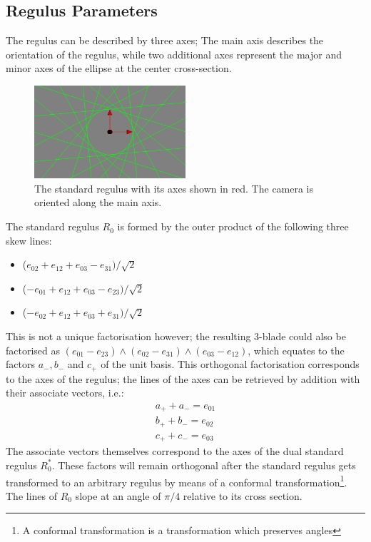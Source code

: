 \documentclass[a4paper, 10pt]{article}
\begin{document}
\subsection{Regulus Parameters}
The regulus can be described by three axes; The main axis describes the
orientation of the regulus, while two additional axes represent the major and
minor axes of the ellipse at the center cross-section.

\begin{figure}[htbp]
  \centering
  \includegraphics[width=0.5\textwidth]{axes.png}
  \caption{The standard regulus with its axes shown in red. The camera is
    oriented along the main axis.}
  \label{fig:axes}
\end{figure}

The standard regulus $R_0$ is formed by the outer product of the following three
skew lines:
\begin{itemize}
  \item ($e_{02} + e_{12} + e_{03} - e_{31}) / \sqrt{2}$
  \item ($-e_{01} + e_{12} + e_{03} - e_{23}) / \sqrt{2}$
  \item ($-e_{02} + e_{12} + e_{03} + e_{31}) / \sqrt{2}$
\end{itemize}

This is not a unique factorisation however; the resulting 3-blade could also be
factorised as $(e_{01} - e_{23}) \wedge (e_{02} - e_{31}) \wedge (e_{03} - e_{12})$, which
equates to the factors $a_-, b_-$ and $c_+$ of the unit basis. This
orthogonal factorisation corresponds to the axes of the regulus; the lines of
the axes can be retrieved by addition with their associate vectors, i.e.:
\begin{align*}
  a_+ + a_- = e_{01} \\
  b_+ + b_- = e_{02} \\
  c_+ + c_- = e_{03}
\end{align*}
The associate vectors themselves correspond to the axes of the dual standard
regulus $R_{0}^*$. These factors will remain orthogonal after the standard
regulus gets transformed to an arbitrary regulus by means of a conformal
transformation\footnote{A conformal transformation is a transformation which
  preserves angles}.
The lines of $R_{0}$ slope at an angle of $\pi / 4$ relative to its cross
section.
\end{document}
